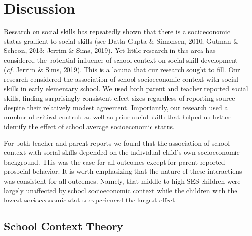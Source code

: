 \documentclass[
  english,
  man]{apa6}
\begin{document}
\hypertarget{discussion}{%
\section{Discussion}\label{discussion}}

Research on social skills has repeatedly shown that there is a socioeconomic status gradient to social skills (see Datta Gupta \& Simonsen, 2010; Gutman \& Schoon, 2013; Jerrim \& Sims, 2019). Yet little research in this area has considered the potential influence of school context on social skill development (\emph{cf.} Jerrim \& Sims, 2019). This is a lacuna that our research sought to fill. Our research considered the association of school socioeconomic context with social skills in early elementary school. We used both parent and teacher reported social skills, finding surprisingly consistent effect sizes regardless of reporting source despite their relatively modest agreement. Importantly, our research used a number of critical controls as well as prior social skills that helped us better identify the effect of school average socioeconomic status.

For both teacher and parent reports we found that the association of school context with social skills depended on the individual child's own socioeconomic background. This was the case for all outcomes except for parent reported prosocial behavior. It is worth emphasizing that the nature of these interactions was consistent for all outcomes. Namely, that middle to high SES children were largely unaffected by school socioeconomic context while the children with the lowest socioeconomic status experienced the largest effect.

\hypertarget{school-context-theory}{%
\subsection{School Context Theory}\label{school-context-theory}}
\end{document}
